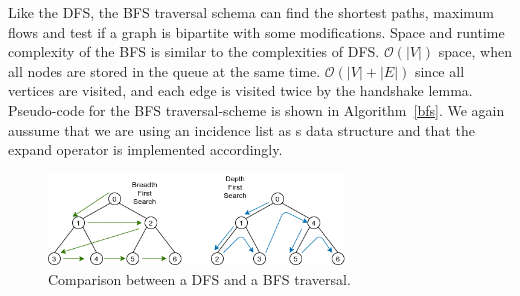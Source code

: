                 Like the DFS, the BFS traversal schema can find the shortest paths, maximum flows and test if a graph is bipartite with some modifications. 
                Space and runtime complexity of the BFS is similar to the complexities of DFS. $\mathcal{O}(|V|)$ space, when all nodes are stored in the queue at the same time. 
                $\mathcal{O}(|V| + |E|)$ since all vertices are visited, and each edge is visited twice by the handshake lemma. 
                Pseudo-code for the BFS traversal-scheme is shown in Algorithm~\ref{bfs}. 
                We again aussume that we are using an incidence list as s data structure and that the expand operator is implemented accordingly.

                \begin{figure}[htp]
                \begin{center}
                \includegraphics[keepaspectratio,width=0.7\textwidth, height=0.3\textheight]{img/03-graphs/bfs-dfs.png}
                \end{center}
                \caption{Comparison between a DFS and a BFS traversal.}\label{dfs-bfs}
                \end{figure}
                
